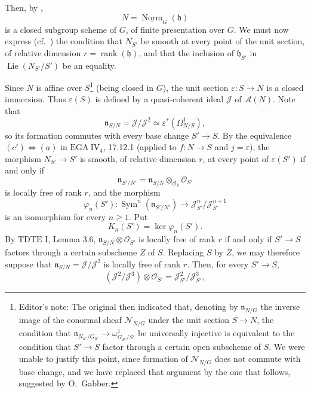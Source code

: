 Then, by ,
\[
  N=\underline{\operatorname{Norm}}_G(\mathfrak h)
\]
is a closed subgroup scheme of \(G\), of finite presentation over
\(G\). We must now express \textup{(cf.\ )} the condition
that \(N_{S'}\) be smooth at every point of the unit section, of
relative dimension \(r=\operatorname{rank}(\mathfrak h)\), and
that the inclusion of \(\mathfrak h_{S'}\) in
\(\operatorname{Lie}(N_{S'}/S')\) be an equality.

Since \(N\) is affine over \(S\)\footnote{Editor's note: The
original then indicated that, denoting by
\(\mathfrak n_{N/G}\) the inverse image of the conormal sheaf
\(\mathcal N_{N/G}\) under the unit section \(S\to N\), the
condition that
\(\mathfrak n_{N_{S'}/G_{S'}}\to
\omega^1_{G_{S'}/S'}\)
be universally injective is equivalent to the condition that
\(S'\to S\) factor through a certain open subscheme of \(S\). We
were unable to justify this point, since formation of
\(\mathcal N_{N/G}\) does not commute with base change, and we
have replaced that argument by the one that follows, suggested by
O.\ Gabber.}
\textup{(being closed in \(G\))}, the unit section
\(\varepsilon\colon S\to N\) is a closed immersion. Thus
\(\varepsilon(S)\) is defined by a quasi-coherent ideal
\(\mathcal J\) of \(\mathcal A(N)\). Note that
\[
  \mathfrak n_{S/N}=\mathcal J/\mathcal J^2
  \simeq \varepsilon^*(\Omega^1_{N/S}),
\]
so its formation commutes with every base change \(S'\to S\).
By the equivalence \textup{\((c')\Longleftrightarrow(a)\)} in
\(\mathrm{EGA}\ \mathrm{IV}_4\), 17.12.1 \textup{(applied to
\(f\colon N\to S\) and \(j=\varepsilon\))}, the morphism
\(N_{S'}\to S'\) is smooth, of relative dimension \(r\), at every
point of \(\varepsilon(S')\) if and only if
\[
  \mathfrak n_{S'/N'}
  =
  \mathfrak n_{S/N}\otimes_{\mathcal O_S}\mathcal O_{S'}
\]
is locally free of rank \(r\), and the morphism
\[
  \varphi_n(S')\colon
  \operatorname{Sym}^n(\mathfrak n_{S'/N'})
  \longrightarrow
  \mathcal J_{S'}^n/\mathcal J_{S'}^{n+1}
\]
is an isomorphism for every \(n\geq1\). Put
\[
  K_n(S')=\ker\varphi_n(S').
\]
By \(\mathrm{TDTE}\) I, Lemma 3.6,
\(\mathfrak n_{S/N}\otimes\mathcal O_{S'}\) is locally free of
rank \(r\) if and only if \(S'\to S\) factors through a certain
subscheme \(Z\) of \(S\). Replacing \(S\) by \(Z\), we may
therefore suppose that
\(\mathfrak n_{S/N}=\mathcal J/\mathcal J^2\) is locally free of
rank \(r\). Then, for every \(S'\to S\),
\[
  (\mathcal J^2/\mathcal J^3)\otimes\mathcal O_{S'}
  =
  \mathcal J_{S'}^2/\mathcal J_{S'}^3,
\]
